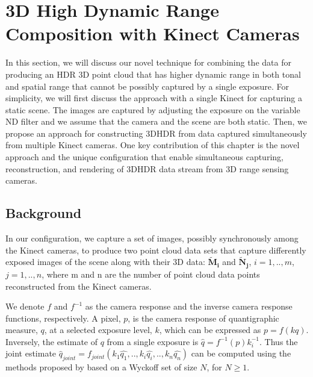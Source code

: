 \section{3D High Dynamic Range Composition with Kinect Cameras} 

In this section, we will discuss our novel technique for combining the data for producing an HDR 3D point cloud that has higher dynamic range in both tonal and spatial range that cannot be possibly captured by a single exposure. For simplicity, we will first discuss the approach with a single Kinect for capturing a static scene. The images are captured by adjusting the exposure on the variable ND filter and we assume that the camera and the scene are both static. Then, we propose an approach for constructing 3DHDR from data captured simultaneously from multiple Kinect cameras. One key contribution of this chapter is the novel approach and the unique configuration that enable simultaneous capturing, reconstruction, and rendering of 3DHDR data stream from 3D range sensing cameras. 

\subsection{Background}
In our configuration, we capture a set of images, possibly synchronously among the Kinect cameras, to produce two point cloud data sets that capture differently exposed images of the scene along with their 3D data: $\mathbf{\tilde{M}_{i}}$ and $\mathbf{\tilde{N}_{j}}$, $i=1,..,m$, $j=1,..,n$, where m and n are the number of point cloud data points reconstructed from the Kinect cameras.

We denote $f$ and $f^{-1}$ as the camera response and the inverse camera response functions, respectively. A pixel, $p$, is the camera response of quantigraphic measure, $q$, at a selected exposure level, $k$, which can be expressed as $p = f(kq)$. Inversely, the estimate of $q$ from a single exposure is $\hat{q} = f^{-1}(p)k_i^{-1}$. Thus the joint estimate $\hat{q}_{joint} = f_{joint}(k_1\hat{q_1}, .., k_i\hat{q_i}, .., k_n\hat{q_n})$ can be computed using the methods proposed by \cite{mannist,robertson2003estimation,ali2012ICASSP} based on a Wyckoff set \cite{wyckoff1962experimental} of size $N$, for $N \ge 1$.

